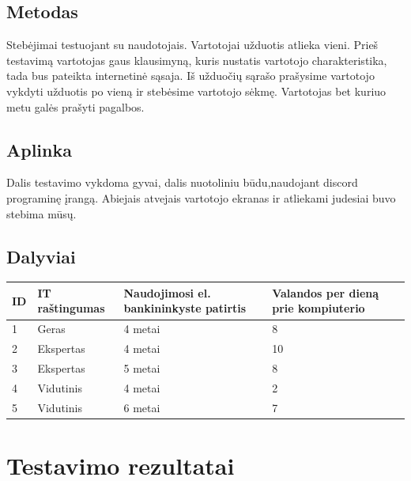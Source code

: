 \documentclass[oneside]{VUMIFPSkursinis}
\begin{document}
\subsection{Metodas}
Stebėjimai testuojant su naudotojais. Vartotojai užduotis atlieka vieni. Prieš testavimą vartotojas gaus klausimyną, kuris nustatis vartotojo charakteristika, tada bus pateikta internetinė sąsaja. Iš užduočių sąrašo prašysime vartotojo vykdyti užduotis po vieną ir stebėsime vartotojo sėkmę. Vartotojas bet kuriuo metu galės prašyti pagalbos. 
\subsection{Aplinka}
Dalis testavimo vykdoma gyvai, dalis nuotoliniu būdu,naudojant discord programinę įrangą. Abiejais atvejais vartotojo ekranas ir atliekami judesiai buvo stebima mūsų.
\subsection{Dalyviai}
\begin{center}
	\begin{tabular}{ |p{1cm} | p{3cm} | p{5cm} | p{5cm} |}
	\hline
ID&IT raštingumas & Naudojimosi el. bankininkyste patirtis & Valandos per dieną prie kompiuterio\\ \hline
1&Geras&4 metai&8 \\ \hline
2&Ekspertas&4 metai&10 \\ \hline
3&Ekspertas&5 metai&8 \\ \hline
4&Vidutinis&4 metai&2 \\ \hline
5&Vidutinis&6 metai&7 \\ \hline
\end{tabular}
\end{center}

\section{Testavimo rezultatai}
\end{document}

